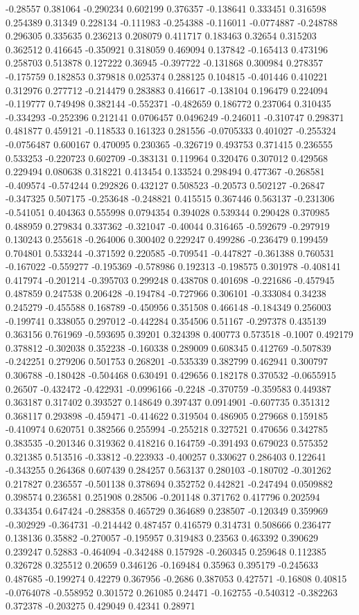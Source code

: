 -0.28557 0.381064 -0.290234 0.602199 0.376357 -0.138641 0.333451 0.316598 0.254389 0.31349 0.228134 -0.111983 -0.254388 -0.116011 -0.0774887 -0.248788 0.296305 0.335635 0.236213 0.208079 0.411717 0.183463 0.32654 0.315203 0.362512 0.416645 -0.350921 0.318059 0.469094 0.137842 -0.165413 0.473196 0.258703 0.513878 0.127222 0.36945 -0.397722 -0.131868 0.300984 0.278357 -0.175759 0.182853 0.379818 0.025374 0.288125 0.104815 -0.401446 0.410221 0.312976 0.277712 -0.214479 0.283883 0.416617 -0.138104 0.196479 0.224094 -0.119777 0.749498 0.382144 -0.552371 -0.482659 0.186772 0.237064 0.310435 -0.334293 -0.252396 0.212141 0.0706457 0.0496249 -0.246011 -0.310747 0.298371 0.481877 0.459121 -0.118533 0.161323 0.281556 -0.0705333 0.401027 -0.255324 -0.0756487 0.600167 0.470095 0.230365 -0.326719 0.493753 0.371415 0.236555 0.533253 -0.220723 0.602709 -0.383131 0.119964 0.320476 0.307012 0.429568 0.229494 0.080638 0.318221 0.413454 0.133524 0.298494 0.477367 -0.268581 -0.409574 -0.574244 0.292826 0.432127 0.508523 -0.20573 0.502127 -0.26847 -0.347325 0.507175 -0.253648 -0.248821 0.415515 0.367446 0.563137 -0.231306 -0.541051 0.404363 0.555998 0.0794354 0.394028 0.539344 0.290428 0.370985 0.488959 0.279834 0.337362 -0.321047 -0.40044 0.316465 -0.592679 -0.297919 0.130243 0.255618 -0.264006 0.300402 0.229247 0.499286 -0.236479 0.199459 0.704801 0.533244 -0.371592 0.220585 -0.709541 -0.447827 -0.361388 0.760531 -0.167022 -0.559277 -0.195369 -0.578986 0.192313 -0.198575 0.301978 -0.408141 0.417974 -0.201214 -0.395703 0.299248 0.438708 0.401698 -0.221686 -0.457945 0.487859 0.247538 0.206428 -0.194784 -0.727966 0.306101 -0.333084 0.34238 0.245279 -0.455588 0.168789 -0.450956 0.351508 0.466148 -0.184349 0.256003 -0.199741 0.338055 0.297012 -0.442284 0.354506 0.51167 -0.297378 0.435139 0.363156 0.761969 -0.593695 0.39201 0.324398 0.400773 0.573518 -0.1007 0.492179 0.378812 -0.302038 0.352238 -0.160338 0.289009 0.608345 0.412769 -0.507839 -0.242251 0.279206 0.501753 0.268201 -0.535339 0.382799 0.462941 0.300797 0.306788 -0.180428 -0.504468 0.630491 0.429656 0.182178 0.370532 -0.0655915 0.26507 -0.432472 -0.422931 -0.0996166 -0.2248 -0.370759 -0.359583 0.449387 0.363187 0.317402 0.393527 0.148649 0.397437 0.0914901 -0.607735 0.351312 0.368117 0.293898 -0.459471 -0.414622 0.319504 0.486905 0.279668 0.159185 -0.410974 0.620751 0.382566 0.255994 -0.255218 0.327521 0.470656 0.342785 0.383535 -0.201346 0.319362 0.418216 0.164759 -0.391493 0.679023 0.575352 0.321385 0.513516 -0.33812 -0.223933 -0.400257 0.330627 0.286403 0.122641 -0.343255 0.264368 0.607439 0.284257 0.563137 0.280103 -0.180702 -0.301262 0.217827 0.236557 -0.501138 0.378694 0.352752 0.442821 -0.247494 0.0509882 0.398574 0.236581 0.251908 0.28506 -0.201148 0.371762 0.417796 0.202594 0.334354 0.647424 -0.288358 0.465729 0.364689 0.238507 -0.120349 0.359969 -0.302929 -0.364731 -0.214442 0.487457 0.416579 0.314731 0.508666 0.236477 0.138136 0.35882 -0.270057 -0.195957 0.319483 0.23563 0.463392 0.390629 0.239247 0.52883 -0.464094 -0.342488 0.157928 -0.260345 0.259648 0.112385 0.326728 0.325512 0.20659 0.346126 -0.169484 0.35963 0.395179 -0.245633 0.487685 -0.199274 0.42279 0.367956 -0.2686 0.387053 0.427571 -0.16808 0.40815 -0.0764078 -0.558952 0.301572 0.261085 0.24471 -0.162755 -0.540312 -0.382263 0.372378 -0.203275 0.429049 0.42341 0.28971 